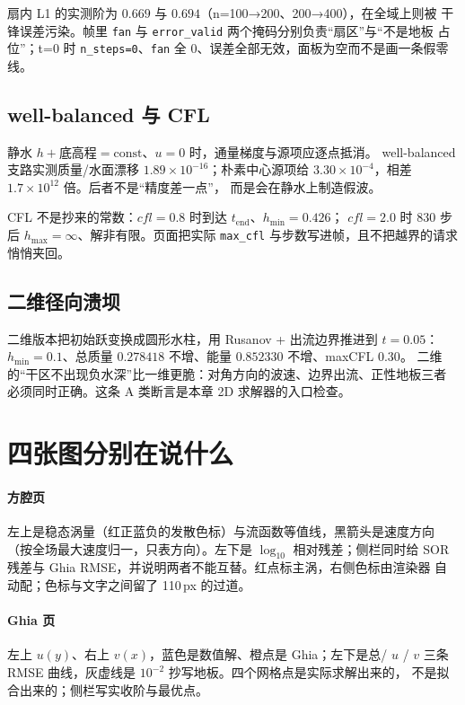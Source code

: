 扇内 L1 的实测阶为 $0.669$ 与 $0.694$（n=100→200、200→400），在全域上则被
干锋误差污染。帧里 \texttt{fan} 与 \texttt{error\_valid} 两个掩码分别负责“扇区”与“不是地板
占位”；t=0 时 \texttt{n\_steps=0}、\texttt{fan} 全 0、误差全部无效，面板为空而不是画一条假零线。

\subsection{well-balanced 与 CFL}

静水 $h+\text{底高程}=\text{const}$、$u=0$ 时，通量梯度与源项应逐点抵消。
well-balanced 支路实测质量/水面漂移 $1.89\times10^{-16}$；朴素中心源项给
$3.30\times10^{-4}$，相差 $1.7\times10^{12}$ 倍。后者不是“精度差一点”，
而是会在静水上制造假波。

CFL 不是抄来的常数：$cfl=0.8$ 时到达 $t_{\text{end}}$、$h_{\min}=0.426$；
$cfl=2.0$ 时 830 步后 $h_{\max}=\infty$、解非有限。页面把实际
\texttt{max\_cfl} 与步数写进帧，且不把越界的请求悄悄夹回。

\subsection{二维径向溃坝}

二维版本把初始跃变换成圆形水柱，用 Rusanov + 出流边界推进到 $t=0.05$：
$h_{\min}=0.1$、总质量 $0.278418$ 不增、能量 $0.852330$ 不增、maxCFL $0.30$。
二维的“干区不出现负水深”比一维更脆：对角方向的波速、边界出流、正性地板三者
必须同时正确。这条 A 类断言是本章 2D 求解器的入口检查。

\section{四张图分别在说什么}\label{sec:reading}

\paragraph{方腔页}
左上是稳态涡量（红正蓝负的发散色标）与流函数等值线，黑箭头是速度方向
（按全场最大速度归一，只表方向）。左下是 $\log_{10}$ 相对残差；侧栏同时给
SOR 残差与 Ghia RMSE，并说明两者不能互替。红点标主涡，右侧色标由渲染器
自动配；色标与文字之间留了 110\,px 的过道。

\paragraph{Ghia 页}
左上 $u(y)$、右上 $v(x)$，蓝色是数值解、橙点是 Ghia；左下是总/ $u$ / $v$
三条 RMSE 曲线，灰虚线是 $10^{-2}$ 抄写地板。四个网格点是实际求解出来的，
不是拟合出来的；侧栏写实收阶与最优点。

